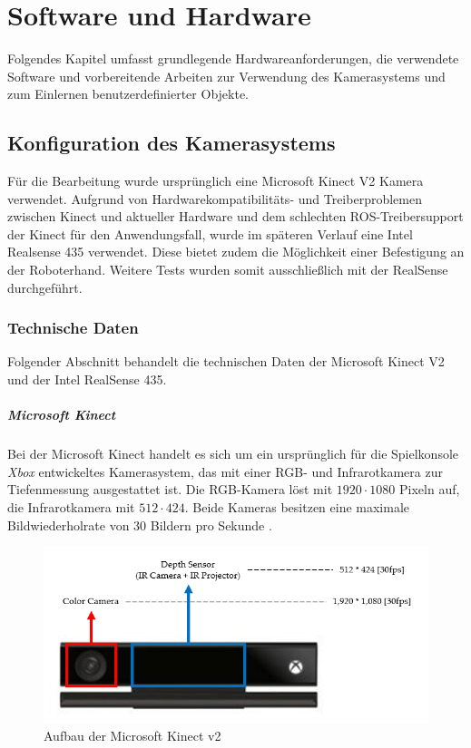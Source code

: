 \chapter{Software und Hardware}

Folgendes Kapitel umfasst grundlegende Hardwareanforderungen, die verwendete Software und vorbereitende Arbeiten zur Verwendung des Kamerasystems und zum Einlernen benutzerdefinierter Objekte.

\section{Konfiguration des Kamerasystems}

Für die Bearbeitung wurde ursprünglich eine Microsoft Kinect V2 Kamera verwendet. Aufgrund von Hardwarekompatibilitäts- und Treiberproblemen zwischen Kinect und aktueller Hardware und dem schlechten \ac{ROS}-Treibersupport der Kinect für den Anwendungsfall, wurde im späteren Verlauf eine Intel Realsense 435 verwendet. Diese bietet zudem die Möglichkeit einer Befestigung an der Roboterhand. Weitere Tests wurden somit ausschließlich mit der RealSense durchgeführt.

\subsection{Technische Daten}

Folgender Abschnitt behandelt die technischen Daten der Microsoft Kinect V2 und der Intel RealSense 435.

\paragraph{Microsoft Kinect}

Bei der Microsoft Kinect handelt es sich um ein ursprünglich für die Spielkonsole \textit{Xbox} entwickeltes Kamerasystem, das mit einer RGB- und Infrarotkamera zur Tiefenmessung ausgestattet ist. Die RGB-Kamera löst mit $1920 \cdot 1080$ Pixeln auf, die Infrarotkamera mit $512 \cdot 424$. Beide Kameras besitzen eine maximale Bildwiederholrate von 30 Bildern pro Sekunde \cite{sung_real-time_2019}.

\begin{figure}[ht]
    \centering
    \includegraphics[width=\textwidth]{Bilder/kinect_aufbau.png}
    \caption{Aufbau der Microsoft Kinect v2 \cite[Abbildung~5]{sung_real-time_2019}}
    \label{fig:kinect_aufbau}
\end{figure}

